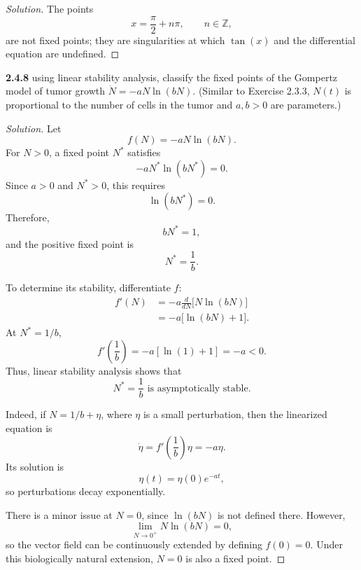\documentclass[10pt]{amsart}
\newenvironment{solution}
{\begin{proof}[Solution]}
{\end{proof}}
\begin{document}
\begin{onehalfspace}
\begin{solution}
            The points
            \[
                x=\frac{\pi}{2}+n\pi,
                \qquad n\in\mathbb{Z},
            \]
            are not fixed points; they are singularities at which \(\tan(x)\) and the
            differential equation are undefined.

        \end{solution}

        \noindent\textbf{2.4.8} using linear stability analysis, classify the fixed points of the
        Gompertz model of tumor growth $\dot{N} = -aN\ln(bN)$.
        (Similar to Exercise 2.3.3, $N(t)$ is proportional to the number of cells in the tumor and
        $a,b > 0$ are parameters.)

        \begin{solution}

            Let
            \[
                f(N)=-aN\ln(bN).
            \]
            For \(N>0\), a fixed point \(N^*\) satisfies
            \[
                -aN^*\ln(bN^*)=0.
            \]
            Since \(a>0\) and \(N^*>0\), this requires
            \[
                \ln(bN^*)=0.
            \]
            Therefore,
            \[
                bN^*=1,
            \]
            and the positive fixed point is
            \[
                \boxed{N^*=\frac{1}{b}.}
            \]

            To determine its stability, differentiate \(f\):
            \begin{align*}
                f'(N)
                &=-a\frac{d}{dN}\bigl[N\ln(bN)\bigr] \\
                &=-a\bigl[\ln(bN)+1\bigr].
            \end{align*}
            At \(N^*=1/b\),
            \[
                f'\left(\frac{1}{b}\right)
                =-a\left[\ln(1)+1\right]
                =-a<0.
            \]
            Thus, linear stability analysis shows that
            \[
                \boxed{N^*=\frac{1}{b}\text{ is asymptotically stable}.}
            \]

            Indeed, if \(N=1/b+\eta\), where \(\eta\) is a small perturbation, then
            the linearized equation is
            \[
                \dot{\eta}
                =f'\left(\frac{1}{b}\right)\eta
                =-a\eta.
            \]
            Its solution is
            \[
                \eta(t)=\eta(0)e^{-at},
            \]
            so perturbations decay exponentially.

            There is a minor issue at \(N=0\), since \(\ln(bN)\) is not defined
            there. However,
            \[
                \lim_{N\to0^+}N\ln(bN)=0,
            \]
            so the vector field can be continuously extended by defining \(f(0)=0\).
            Under this biologically natural extension, \(N=0\) is also a fixed point.


\end{solution}
\end{onehalfspace}
\end{document}
